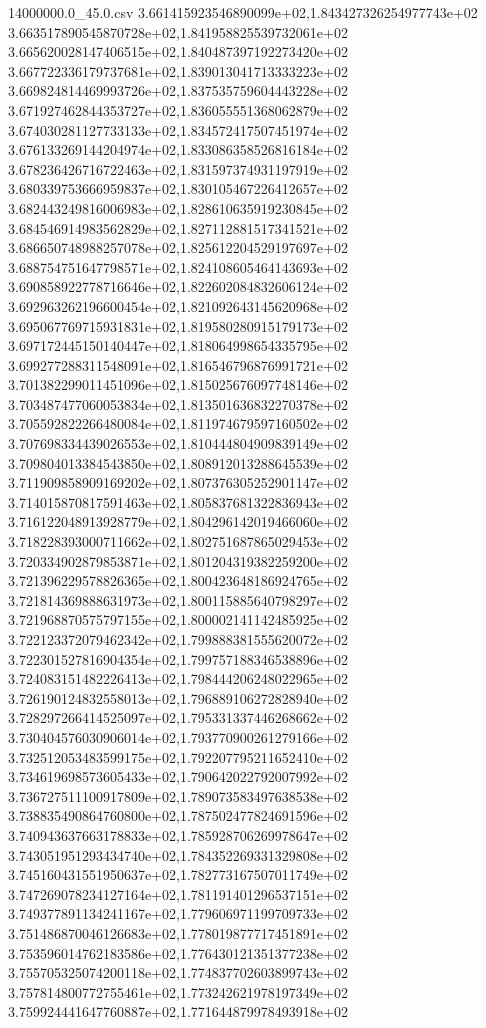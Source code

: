 \begin{filecontents*}{14000000.0_45.0.csv}
3.661415923546890099e+02,1.843427326254977743e+02
3.663517890545870728e+02,1.841958825539732061e+02
3.665620028147406515e+02,1.840487397192273420e+02
3.667722336179737681e+02,1.839013041713333223e+02
3.669824814469993726e+02,1.837535759604443228e+02
3.671927462844353727e+02,1.836055551368062879e+02
3.674030281127733133e+02,1.834572417507451974e+02
3.676133269144204974e+02,1.833086358526816184e+02
3.678236426716722463e+02,1.831597374931197919e+02
3.680339753666959837e+02,1.830105467226412657e+02
3.682443249816006983e+02,1.828610635919230845e+02
3.684546914983562829e+02,1.827112881517341521e+02
3.686650748988257078e+02,1.825612204529197697e+02
3.688754751647798571e+02,1.824108605464143693e+02
3.690858922778716646e+02,1.822602084832606124e+02
3.692963262196600454e+02,1.821092643145620968e+02
3.695067769715931831e+02,1.819580280915179173e+02
3.697172445150140447e+02,1.818064998654335795e+02
3.699277288311548091e+02,1.816546796876991721e+02
3.701382299011451096e+02,1.815025676097748146e+02
3.703487477060053834e+02,1.813501636832270378e+02
3.705592822266480084e+02,1.811974679597160502e+02
3.707698334439026553e+02,1.810444804909839149e+02
3.709804013384543850e+02,1.808912013288645539e+02
3.711909858909169202e+02,1.807376305252901147e+02
3.714015870817591463e+02,1.805837681322836943e+02
3.716122048913928779e+02,1.804296142019466060e+02
3.718228393000711662e+02,1.802751687865029453e+02
3.720334902879853871e+02,1.801204319382259200e+02
3.721396229578826365e+02,1.800423648186924765e+02
3.721814369888631973e+02,1.800115885640798297e+02
3.721968870575797155e+02,1.800002141142485925e+02
3.722123372079462342e+02,1.799888381555620072e+02
3.722301527816904354e+02,1.799757188346538896e+02
3.724083151482226413e+02,1.798444206248022965e+02
3.726190124832558013e+02,1.796889106272828940e+02
3.728297266414525097e+02,1.795331337446268662e+02
3.730404576030906014e+02,1.793770900261279166e+02
3.732512053483599175e+02,1.792207795211652410e+02
3.734619698573605433e+02,1.790642022792007992e+02
3.736727511100917809e+02,1.789073583497638538e+02
3.738835490864760800e+02,1.787502477824691596e+02
3.740943637663178833e+02,1.785928706269978647e+02
3.743051951293434740e+02,1.784352269331329808e+02
3.745160431551950637e+02,1.782773167507011749e+02
3.747269078234127164e+02,1.781191401296537151e+02
3.749377891134241167e+02,1.779606971199709733e+02
3.751486870046126683e+02,1.778019877717451891e+02
3.753596014762183586e+02,1.776430121351377238e+02
3.755705325074200118e+02,1.774837702603899743e+02
3.757814800772755461e+02,1.773242621978197349e+02
3.759924441647760887e+02,1.771644879978493918e+02

\end{filecontents*}
